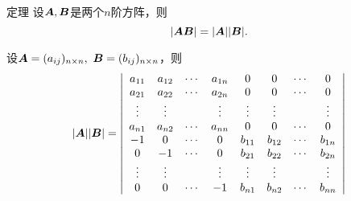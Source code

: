 \begin{frame}
  \begin{footnotesize}
    \begin{block}{定理}
      设$\boldsymbol{A},\boldsymbol{B}$是两个$n$阶方阵，则
      $$
      |\boldsymbol{A}\boldsymbol{B}| = |\boldsymbol{A}||\boldsymbol{B}|.
      $$
    \end{block}
    \pause 
    \proofname
    设$\boldsymbol{A}=(a_{ij})_{n\times n}, ~\boldsymbol{B}=(b_{ij})_{n\times n}$，则
    $$
    |\boldsymbol{A}||\boldsymbol{B}| = \left|
      \begin{array}{cccccccc}
        a_{11} & a_{12} & \cdots &  a_{1n} & 0 & 0 & \cdots & 0\\
        a_{21} & a_{22} & \cdots &  a_{2n} & 0 & 0 & \cdots & 0\\
        \vdots   & \vdots   &     & \vdots    & \vdots & \vdots & & \vdots\\
        a_{n1} & a_{n2} & \cdots &  a_{nn} & 0 & 0 & \cdots & 0\\
        -1    & 0     & \cdots &   0    & b_{11} & b_{12} & \cdots & b_{1n} \\
        0 & -1 & \cdots & 0& b_{21} & b_{22} & \cdots & b_{2n} \\
        \vdots&\vdots & & \vdots &  \vdots  &\vdots &  & \vdots   \\
        0 & 0 & \cdots & -1 & b_{n1} & b_{n2} &\cdots     & b_{nn}
      \end{array}
    \right|
    $$
    
  \end{footnotesize}
\end{frame}


